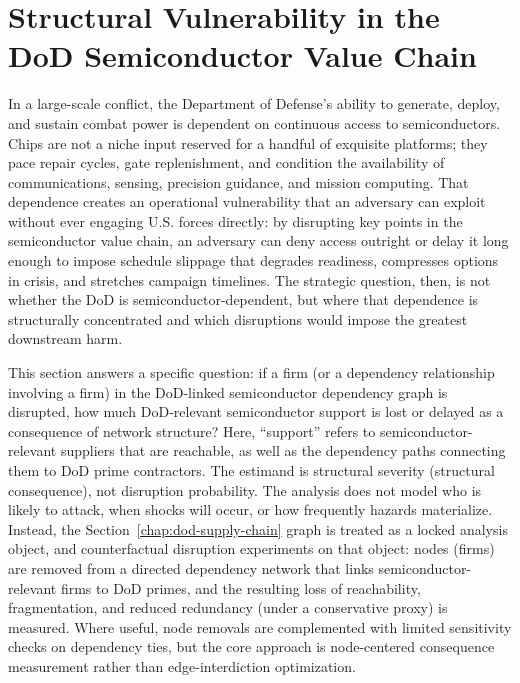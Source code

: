 \chapter{Structural Vulnerability in the DoD Semiconductor Value Chain}
\label{chap:network_analysis}

In a large-scale conflict, the Department of Defense's ability to generate, deploy, and sustain combat power is dependent on continuous access to semiconductors. Chips are not a niche input reserved for a handful of exquisite platforms; they pace repair cycles, gate replenishment, and condition the availability of communications, sensing, precision guidance, and mission computing. That dependence creates an operational vulnerability that an adversary can exploit without ever engaging U.S. forces directly: by disrupting key points in the semiconductor value chain, an adversary can deny access outright or delay it long enough to impose schedule slippage that degrades readiness, compresses options in crisis, and stretches campaign timelines. The strategic question, then, is not whether the DoD is semiconductor-dependent, but where that dependence is structurally concentrated and which disruptions would impose the greatest downstream harm.

This section answers a specific question: if a firm (or a dependency relationship involving a firm) in the DoD-linked semiconductor dependency graph is disrupted, how much DoD-relevant semiconductor support is lost or delayed as a consequence of network structure? Here, ``support'' refers to semiconductor-relevant suppliers that are reachable, as well as the dependency paths connecting them to DoD prime contractors. The estimand is structural severity (structural consequence), not disruption probability. The analysis does not model who is likely to attack, when shocks will occur, or how frequently hazards materialize. Instead, the Section~\ref{chap:dod-supply-chain} graph is treated as a locked analysis object, and counterfactual disruption experiments on that object: nodes (firms) are removed from a directed dependency network that links semiconductor-relevant firms to DoD primes, and the resulting loss of reachability, fragmentation, and reduced redundancy (under a conservative proxy) is measured. Where useful, node removals are complemented with limited sensitivity checks on dependency ties, but the core approach is node-centered consequence measurement rather than edge-interdiction optimization.

